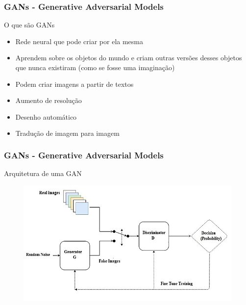 \documentclass{beamer}
\begin{document}
\begin{frame}
	\frametitle{GANs - Generative Adversarial Models}
	\begin{block}{O que são GANs}
		\begin{itemize}
			\item Rede neural que pode criar por ela mesma
			\item Aprendem sobre os objetos do mundo e criam outras versões desses
			objetos que nunca existiram (como se fosse uma imaginação)
			\item Podem criar imagens a partir de textos
			\item Aumento de resolução
			\item Desenho automático
			\item Tradução de imagem para imagem
		\end{itemize}
	\end{block}
\end{frame}
\begin{frame}
	\frametitle{GANs - Generative Adversarial Models}
	\begin{block}{Arquitetura de uma GAN}
		\begin{figure}
			\centering
			\includegraphics[width=0.7\linewidth]{figures/GAN_achi}
		\end{figure}
		\href{https://developers.google.com/machine-learning/gan/gan_structure?hl=pt-br}{} 
	\end{block}
\end{frame}
\end{document}
